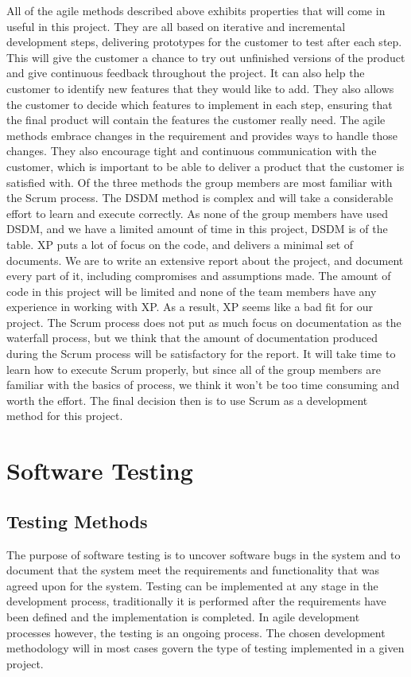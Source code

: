 All of the agile methods described above exhibits properties that will come in useful in this project. They are all based on iterative and incremental development steps, delivering prototypes for the customer to test after each step. This will give the customer a chance to try out unfinished versions of the product and give continuous feedback throughout the project. It can also help the customer to identify new features that they would like to add. They also allows the customer to decide which features to implement in each step, ensuring that the final product will contain the features the customer really need. The agile methods embrace changes in the requirement and provides ways to handle those changes. They also encourage tight and continuous communication with the customer, which is important to be able to deliver a product that the customer is satisfied with. Of the three methods the group members are most familiar with the Scrum process. The DSDM method is complex and will take a considerable effort to learn and execute correctly. As none of the group members have used DSDM, and we have a limited amount of time in this project, DSDM is of the table. XP puts a lot of focus on the code, and delivers a minimal set of documents. We are to write an extensive report about the project, and document every part of it, including compromises and assumptions made. The amount of code in this project will be limited and none of the team members have any experience in working with XP. As a result, XP seems like a bad fit for our project. The Scrum process does not put as much focus on documentation as the waterfall process, but we think that the amount of documentation produced during the Scrum process will be satisfactory for the report. It will take time to learn how to execute Scrum properly, but since all of the group members are familiar with the basics of process, we think it won’t be too time consuming and worth the effort. The final decision then is to use Scrum as a development method for this project.

\section{Software Testing}

\subsection{Testing Methods}
The purpose of software testing is to uncover software bugs in the system and to document that the system meet the requirements and functionality that was agreed upon for the system. Testing can be implemented at any stage in the development process, traditionally it is performed after the requirements have been defined and the implementation is completed. In agile development processes however, the testing is an ongoing process. The chosen development methodology will in most cases govern the type of testing implemented in a given project.
\cite{sommerville2011software}

